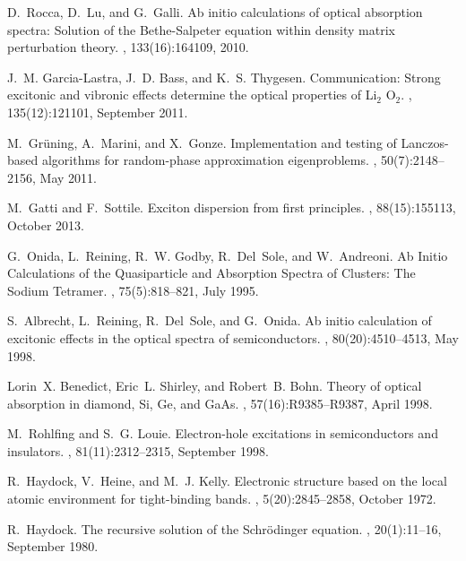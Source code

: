 \documentclass[aps,prb,10pt,showpacs,superscriptaddress,twocolumn,notitlepage]{revtex4-1}
\begin{document}
\begin{thebibliography}{10}
D.~Rocca, D.~Lu, and G.~Galli.
\newblock Ab initio calculations of optical absorption spectra: {Solution} of
  the {Bethe}-{Salpeter} equation within density matrix perturbation theory.
, 133(16):164109, 2010.

J.~M. Garcia-Lastra, J.~D. Bass, and K.~S. Thygesen.
\newblock Communication: {Strong} excitonic and vibronic effects determine the
  optical properties of {Li}$_{2}$ {O}$_{2}$.
, 135(12):121101, September 2011.

M.~Gr{\"u}ning, A.~Marini, and X.~Gonze.
\newblock Implementation and testing of {Lanczos}-based algorithms for
  random-phase approximation eigenproblems.
, 50(7):2148--2156, May 2011.

M.~Gatti and F.~Sottile.
\newblock Exciton dispersion from first principles.
, 88(15):155113, October 2013.

G.~Onida, L.~Reining, R.~W. Godby, R.~Del~Sole, and W.~Andreoni.
\newblock Ab {Initio} {Calculations} of the {Quasiparticle} and {Absorption}
  {Spectra} of {Clusters}: {The} {Sodium} {Tetramer}.
, 75(5):818--821, July 1995.

S.~Albrecht, L.~Reining, R.~Del~Sole, and G.~Onida.
\newblock Ab initio calculation of excitonic effects in the optical spectra of
  semiconductors.
, 80(20):4510--4513, May 1998.

Lorin~X. Benedict, Eric~L. Shirley, and Robert~B. Bohn.
\newblock Theory of optical absorption in diamond, {Si}, {Ge}, and {GaAs}.
, 57(16):R9385--R9387, April 1998.

M.~Rohlfing and S.~G. Louie.
\newblock Electron-hole excitations in semiconductors and insulators.
, 81(11):2312--2315, September 1998.

R.~Haydock, V.~Heine, and M.~J. Kelly.
\newblock Electronic structure based on the local atomic environment for
  tight-binding bands.
, 5(20):2845--2858, October 1972.

R.~Haydock.
\newblock The recursive solution of the {Schr{\"o}dinger} equation.
, 20(1):11--16, September 1980.


\end{thebibliography}
\end{document}
